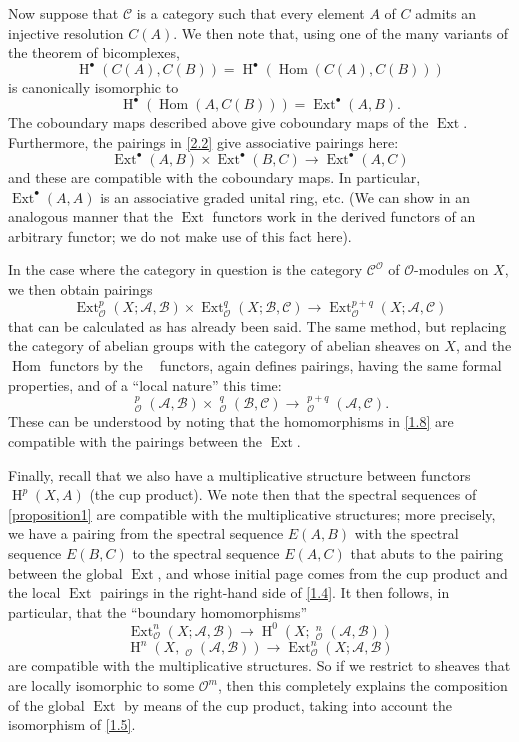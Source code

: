 \documentclass{article}
\theoremstyle{plain}
\theoremstyle{definition}
\newcommand{\sh}{\mathscr}
\newcommand{\cat}{\mathcal}
\DeclareMathOperator{\Ext}{Ext}
\DeclareMathOperator{\Hom}{Hom}
\DeclareMathOperator{\shExt}{\underline{Ext}}
\DeclareMathOperator{\shHom}{\underline{Hom}}
\DeclareMathOperator{\HH}{H}
\newcommand{\oldpage}[1]{\marginpar{\footnotesize$\Big\vert$ \textit{p.~#1}}}
\begin{document}
Now suppose that $\cat{C}$ is a category such that every element $A$ of $C$ admits an injective resolution $C(A)$.
We then note that, using one of the many variants of the theorem of bicomplexes,
\[
  \HH^\bullet(C(A),C(B)) = \HH^\bullet(\Hom(C(A),C(B)))
\]
is canonically isomorphic to
\[
  \HH^\bullet(\Hom(A,C(B))) = \Ext^\bullet(A,B).
\]
The coboundary maps described above give coboundary maps of the $\Ext$.
Furthermore, the pairings in \cref{2.2} give associative pairings here:
\[
\label{2.3}
  \Ext^\bullet(A,B)\times\Ext^\bullet(B,C) \to \Ext^\bullet(A,C)
\tag{2.3}
\]
and these are compatible with the coboundary maps.
In particular, $\Ext^\bullet(A,A)$ is an associative graded unital ring, etc.
(We can show in an analogous manner that the $\Ext$ functors work in the derived functors of an arbitrary functor;
we do not make use of this fact here).

In the case where the category in question is the category $\cat{C}^\sh{O}$ of $\sh{O}$-modules on $X$, we then obtain pairings
\[
\label{2.4}
  \Ext_\sh{O}^p(X;\sh{A},\sh{B})\times\Ext_\sh{O}^q(X;\sh{B},\sh{C}) \to \Ext_\sh{O}^{p+q}(X;\sh{A},\sh{C})
\tag{2.4}
\]
that can be calculated as has already been said.
The same method, but replacing the category of abelian groups with the category of abelian sheaves on $X$, and the $\Hom$ functors by the $\shHom$ functors, again defines pairings, having the same formal properties, and of a ``local nature'' this time:
\[
\label{2.5}
  \shExt_\sh{O}^p(\sh{A},\sh{B})\times\shExt_\sh{O}^q(\sh{B},\sh{C}) \to \shExt_\sh{O}^{p+q}(\sh{A},\sh{C}).
\tag{2.5}
\]
These can be understood by noting that the homomorphisms in \cref{1.8} are compatible with the pairings between the $\Ext$.

\oldpage{149-05}
Finally, recall that we also have a multiplicative structure between functors $\HH^p(X,A)$ (the cup product).
We note then that the spectral sequences of \cref{proposition1} are compatible with the multiplicative structures;
more precisely, we have a pairing from the spectral sequence $E(A,B)$ with the spectral sequence $E(B,C)$ to the spectral sequence $E(A,C)$ that abuts to the pairing between the global $\Ext$, and whose initial page comes from the cup product and the local $\Ext$ pairings in the right-hand side of \cref{1.4}.
It then follows, in particular, that the ``boundary homomorphisms''
\[
\label{2.6}
  \Ext_\sh{O}^n(X;\sh{A},\sh{B}) \to \HH^0(X;\shExt_\sh{O}^n(\sh{A},\sh{B}))
\tag{2.6}
\]
\[
\label{2.7}
  \HH^n(X,\shHom_\sh{O}(\sh{A},\sh{B})) \to \Ext_\sh{O}^n(X;\sh{A},\sh{B})
\tag{2.7}
\]
are compatible with the multiplicative structures.
So if we restrict to sheaves that are locally isomorphic to some $\sh{O}^m$, then this completely explains the composition of the global $\Ext$ by means of the cup product, taking into account the isomorphism of \cref{1.5}.
\end{document}
